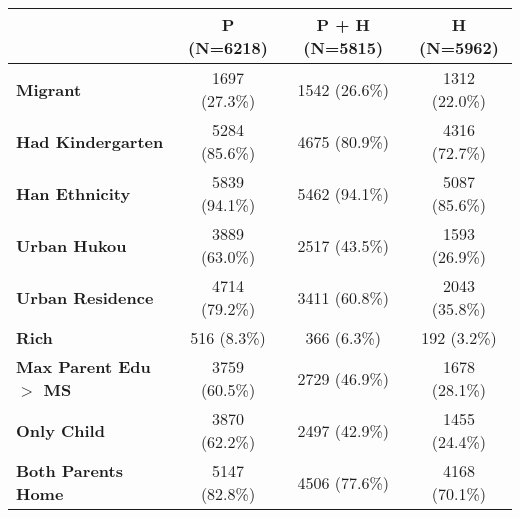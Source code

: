 
\begin{tabular}{l|c|c|c}
\hline
 & P (N=6218) & P + H (N=5815) & H (N=5962)\\
\hline
\textbf{Migrant} & 1697 (27.3\%) & 1542 (26.6\%) & 1312 (22.0\%)\\
\hline
\textbf{Had Kindergarten} & 5284 (85.6\%) & 4675 (80.9\%) & 4316 (72.7\%)\\
\hline
\textbf{Han Ethnicity} & 5839 (94.1\%) & 5462 (94.1\%) & 5087 (85.6\%)\\
\hline
\textbf{Urban Hukou} & 3889 (63.0\%) & 2517 (43.5\%) & 1593 (26.9\%)\\
\hline
\textbf{Urban Residence} & 4714 (79.2\%) & 3411 (60.8\%) & 2043 (35.8\%)\\
\hline
\textbf{Rich} & 516 (8.3\%) & 366 (6.3\%) & 192 (3.2\%)\\
\hline
\textbf{Max Parent Edu $>$ MS} & 3759 (60.5\%) & 2729 (46.9\%) & 1678 (28.1\%)\\
\hline
\textbf{Only Child} & 3870 (62.2\%) & 2497 (42.9\%) & 1455 (24.4\%)\\
\hline
\textbf{Both Parents Home} & 5147 (82.8\%) & 4506 (77.6\%) & 4168 (70.1\%)\\
\hline
\end{tabular}

